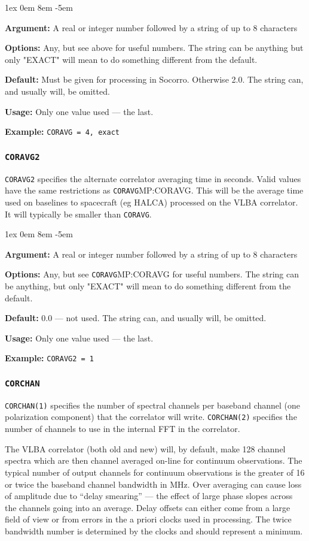 \documentclass{report}
\newcommand{\rcwbox}[5]{
  \begin{list}{}{\parsep 1ex  \itemsep 0em
                 \leftmargin 8em  \itemindent -5em }
    \item {\bf Argument:} #1
    \item {\bf Options:}  #2
    \item {\bf Default:}  #3
    \item {\bf Usage:}    #4
    \item {\bf Example:}  #5
  \end{list}
}
\begin{document}
\rcwbox
{A real or integer number followed by a string of up to 8 characters}
{Any, but see above for useful numbers. The string can be anything but
only "EXACT" will mean to do something different from the default.}
{Must be given for processing in Socorro.  Otherwise 2.0.  The string
can, and usually will, be omitted.}
{Only one value used --- the last.}
{{\tt CORAVG = 4, exact}}

\subsubsection{\label{MP:CORAVG2}{\tt CORAVG2}}

{\tt CORAVG2} specifies the alternate correlator averaging time in
seconds.  Valid values have the same restrictions as \htmlref
{{\tt CORAVG}}{MP:CORAVG}.  This will be the average time used
on baselines to spacecraft (eg HALCA) processed on the VLBA correlator.
It will typically be smaller than {\tt CORAVG}.

\rcwbox
{A real or integer number followed by a string of up to 8 characters}
{Any, but see \htmlref
{{\tt CORAVG}}{MP:CORAVG} for useful numbers. The string can be anything, but
only "EXACT" will mean to do something different from the default.}
{0.0 --- not used.  The string can, and usually will, be omitted.}
{Only one value used --- the last.}
{{\tt CORAVG2 = 1}}

\subsubsection{\label{MP:CORCHAN}{\tt CORCHAN}}

{\tt CORCHAN(1)} specifies the number of spectral channels per baseband
channel (one polarization component) that the correlator will write.
{\tt CORCHAN(2)} specifies the number of channels to use in the internal
FFT in the correlator.

The VLBA correlator (both old and new) will, by default, make 128
channel spectra which are then channel averaged on-line for continuum
observations.  The typical number of output channels for continuum
observations is the greater of 16 or twice the baseband channel
bandwidth in MHz.  Over averaging can cause loss of amplitude due to
``delay smearing'' --- the effect of large phase slopes across the
channels going into an average.  Delay offsets can either come from a
large field of view or from errors in the a priori clocks used in
processing.  The twice bandwidth number is determined by the clocks
and should represent a minimum.
\end{document}

